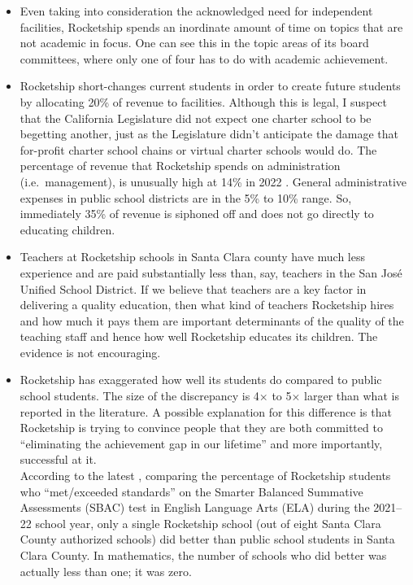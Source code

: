\begin{enumerate}[topsep=0.3\baselineskip,itemsep=0.25\baselineskip,resume]
\begin{itemize}%
    \item Even taking into consideration the acknowledged need for independent facilities, Rocketship spends an inordinate amount of time on topics that are not academic in focus. One can see this in the topic areas of its board committees, where only one of four has to do with academic achievement.
      \item Rocketship short-changes current students in order to create future students by allocating 20\% of revenue to facilities. Although this is legal, I suspect that the California Legislature did not expect one charter school to be begetting another, just as the Legislature didn't anticipate the damage that for-profit charter school chains or virtual charter schools would do.
      The percentage of revenue that Rocketship spends on administration (i.e.\ management), is unusually high at 14\% in 2022 \parencite[38]{RSEA2022}. General administrative expenses in public school districts are in the 5\% to 10\% range. So, immediately 35\% of revenue is siphoned off and does not go directly to educating children.
      \item Teachers at Rocketship schools in Santa Clara county have much less experience and are paid substantially less than, say, teachers in the San José Unified School District. If we believe that teachers are a key factor in delivering a quality education, then what kind of teachers Rocketship hires and how much it pays them are important determinants of the quality of the teaching staff and hence how well Rocketship educates its children. The evidence is not encouraging.
      \item Rocketship has exaggerated how well its students do compared to public school students. The size of the discrepancy is 4× to 5× larger than what is reported in the literature. A possible explanation for this difference is that Rocketship is trying to convince people that they are both committed to ``eliminating the achievement gap in our lifetime'' and more importantly, successful at it.\\
      According to the latest , comparing the percentage of Rocketship students who ``met/exceeded standards'' on the Smarter Balanced Summative Assessments (SBAC) test in English Language Arts (ELA) during the 2021–22 school year, only a single Rocketship school (out of eight Santa Clara County authorized schools) did better than public school students in Santa Clara County. In mathematics, the number of schools who did better was actually less than one; it was zero.\\

\end{itemize}
\end{enumerate}
